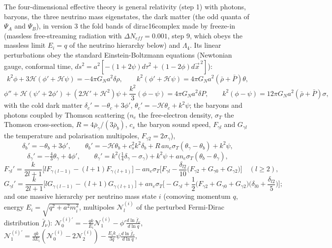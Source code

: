 \documentclass[
  10pt,
]{article}
\begin{document}
The four-dimensional effective theory is general relativity (step 1)
with photons, baryons, the three neutrino mass eigenstates, the dark
matter (the odd quanta of \(\Psi_A\) and \(\Psi_B\)), in version 3 the
fold bands of dirac16complex made by freeze-in (massless free-streaming
radiation with \(\Delta N_{eff} = 0.001\), step 9, which obeys the
massless limit \(E_i = q\) of the neutrino hierarchy below) and
\(\Lambda_4\). Its linear perturbations obey the standard
Einstein-Boltzmann equations (Newtonian gauge, conformal time,
\(ds^2 = a^2[-(1 + 2\psi)d\tau^2 + (1 - 2\phi)d\vec x^{\,2}]\)):
\[ k^2\phi + 3\mathcal H(\phi' + \mathcal H\psi) = -4\pi G_Na^2\delta\rho,\qquad k^2(\phi' + \mathcal H\psi) = 4\pi G_Na^2(\bar\rho + \bar P)\theta,\]
\[ \phi'' + \mathcal H(\psi' + 2\phi') + (2\mathcal H' + \mathcal H^2)\psi + \frac{k^2}{3}(\phi - \psi) = 4\pi G_Na^2\delta P,\qquad k^2(\phi - \psi) = 12\pi G_Na^2(\bar\rho + \bar P)\sigma,\]
with the cold dark matter \(\delta_c' = -\theta_c + 3\phi'\),
\(\theta_c' = -\mathcal H\theta_c + k^2\psi\); the baryons and photons
coupled by Thomson scattering (\(n_e\) the free-electron density,
\(\sigma_T\) the Thomson cross-section,
\(R = 4\bar\rho_\gamma/(3\bar\rho_b)\), \(c_s\) the baryon sound speed,
\(F_{\gamma l}\) and \(G_{\gamma l}\) the temperature and polarisation
multipoles, \(F_{\gamma2} = 2\sigma_\gamma\)),
\[ \delta_b' = -\theta_b + 3\phi',\qquad \theta_b' = -\mathcal H\theta_b + c_s^2k^2\delta_b + R\,an_e\sigma_T(\theta_\gamma - \theta_b) + k^2\psi, \]
\[ \delta_\gamma' = -\tfrac43\theta_\gamma + 4\phi',\qquad \theta_\gamma' = k^2\big(\tfrac14\delta_\gamma - \sigma_\gamma\big) + k^2\psi + an_e\sigma_T(\theta_b - \theta_\gamma), \]
\[ F_{\gamma l}' = \frac{k}{2l + 1}\big[lF_{\gamma(l-1)} - (l + 1)F_{\gamma(l+1)}\big] - an_e\sigma_T\Big[F_{\gamma l} - \frac{\delta_{l2}}{10}\big(F_{\gamma2} + G_{\gamma0} + G_{\gamma2}\big)\Big]\quad (l \ge 2),\]
\[ G_{\gamma l}' = \frac{k}{2l + 1}\big[lG_{\gamma(l-1)} - (l + 1)G_{\gamma(l+1)}\big] + an_e\sigma_T\Big[-G_{\gamma l} + \frac12\big(F_{\gamma2} + G_{\gamma0} + G_{\gamma2}\big)\Big(\delta_{l0} + \frac{\delta_{l2}}{5}\Big)\Big] ;\]
and one massive hierarchy per neutrino mass state \(i\) (comoving
momentum \(q\), energy \(E_i = \sqrt{q^2 + a^2m_i^2}\), multipoles
\(\mathcal N^{(i)}_l\) of the perturbed Fermi-Dirac distribution
\(\bar f_\nu\)):
\(\mathcal N^{(i)\prime}_0 = -\frac{qk}{E_i}\mathcal N^{(i)}_1 - \phi'\frac{d\ln\bar f_\nu}{d\ln q}\),
\(\mathcal N^{(i)\prime}_1 = \frac{qk}{3E_i}(\mathcal N^{(i)}_0 - 2\mathcal N^{(i)}_2) - \frac{E_ik}{3q}\psi\frac{d\ln\bar f_\nu}{d\ln q}\),
\end{document}
